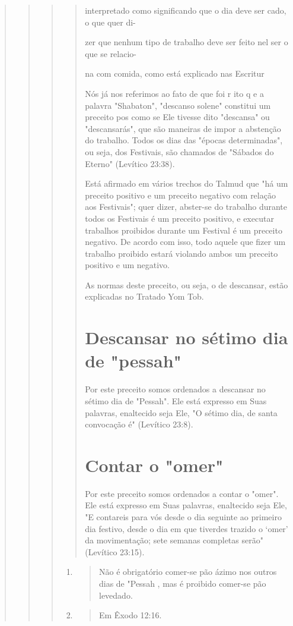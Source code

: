 \begin{quote}
\begin{quote}
\begin{quote}
\begin{quote}
interpretado como significando que o dia deve ser cado, o que quer di-

zer que nenhum tipo de trabalho deve ser feito nel ser o que se relacio-

na com comida, como está explicado nas Escritur

Nós já nos referimos ao fato de que foi r ito q e a palavra "Shaba­ton",
"descanso solene" constitui um preceito pos como se Ele tivesse dito
"descansa" ou "descansarás", que são maneiras de impor a abstenção do
trabalho. Todos os dias das "épocas determinadas", ou seja, dos
Festivais, são chamados de "Sábados do Eterno" (Levítico 23:38).

Está afirmado em vários trechos do Talmud que "há um preceito po­sitivo
e um preceito negativo com relação aos Festivais"; quer dizer, abster-se
do trabalho durante todos os Festivais é um preceito positivo, e
executar traba­lhos proibidos durante um Festival é um preceito
negativo. De acordo com is­so, todo aquele que fizer um trabalho
proibido estará violando ambos um pre­ceito positivo e um negativo.

As normas deste preceito, ou seja, o de descansar, estão explicadas no
Tratado Yom Tob.

\section{Descansar no sétimo dia de "pessah"}

Por este preceito somos ordenados a descansar no sétimo dia de
"Pes­sah". Ele está expresso em Suas palavras, enaltecido seja Ele, "O
sétimo dia, de santa convocação é" (Levítico 23:8).

\section{Contar o "omer"}

Por este preceito somos ordenados a contar o "omer". Ele está ex­presso
em Suas palavras, enaltecido seja Ele, "E contareis para vós desde o dia
seguinte ao primeiro dia festivo, desde o dia em que tiverdes trazido o
`omer' da movimentação; sete semanas completas serão" (Levítico 23:15).
\end{quote}

\begin{enumerate}
\def\labelenumi{\arabic{enumi}.}
\setcounter{enumi}{182}
\item
 \begin{quote}
 Não é obrigatório comer-se pão ázimo nos outros dias de "Pessah , mas
 é proibido comer-se pão levedado.
 \end{quote}
\item
 \begin{quote}
 Em Êxodo 12:16.
 \end{quote}
\end{enumerate}


\end{quote}
\end{quote}
\end{quote}
